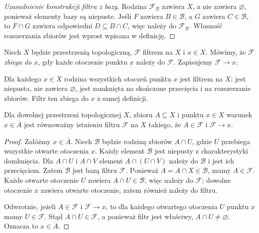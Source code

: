 \begin{proof}[Uzasadnienie konstrukcji filtru z bazy]
Rodzina $\mathcal F_{\mathcal B}$ zawiera $X$,
a nie zawiera $\varnothing$, ponieważ elementy bazy
są niepuste. Jeśli $F$ zawiera $B\in\mathcal B$, a $G$
zawiera $C\in\mathcal B$, to $F\cap G$ zawiera
odpowiedni $D\subseteq B\cap C$, więc należy
do $\mathcal F_{\mathcal B}$. Własność rozszerzania
zbiorów jest wprost wpisana w definicję.
\end{proof}

\begin{definicja}
\label{def:topog-filtr-granica}
Niech $X$ będzie przestrzenią topologiczną,
$\mathcal F$ filtrem na $X$ i $x\in X$.
Mówimy, że $\mathcal F$ \emph{zbiega do $x$}, gdy
każde otoczenie punktu $x$ należy do $\mathcal F$.
Zapisujemy $\mathcal F\to x$.
\end{definicja}

\begin{przyklad}
\label{ex:topog-filtr-otoczen}
Dla każdego $x\in X$ rodzina wszystkich otoczeń
punktu $x$ jest filtrem na $X$: jest niepusta,
nie zawiera $\varnothing$, jest zamknięta na skończone
przecięcia i na rozszerzanie zbiorów.
Filtr ten zbiega do $x$ z samej definicji.
\end{przyklad}

\begin{twierdzenie}
\label{thm:topog-filtr-domkniecie}
Dla dowolnej przestrzeni topologicznej $X$,
zbioru $A\subseteq X$ i punktu $x\in X$ warunek
$x\in\overline A$ jest równoważny istnieniu
filtru $\mathcal F$ na $X$ takiego, że
$A\in\mathcal F$ i $\mathcal F\to x$.
\end{twierdzenie}
\begin{proof}
Załóżmy $x\in\overline A$. Niech $\mathcal B$
będzie rodziną zbiorów $A\cap U$, gdzie $U$
przebiega wszystkie otwarte otoczenia $x$.
Każdy element $\mathcal B$ jest niepusty z
charakterystyki domknięcia. Dla $A\cap U$ i $A\cap V$
element $A\cap(U\cap V)$ należy do $\mathcal B$
i jest ich przecięciem. Zatem $\mathcal B$ jest bazą
filtru $\mathcal F$. Ponieważ $A=A\cap X\in\mathcal B$,
mamy $A\in\mathcal F$. Każde otwarte otoczenie
$U$ zawiera $A\cap U\in\mathcal B$, więc należy
do $\mathcal F$; dowolne otoczenie $x$ zawiera
otwarte otoczenie, zatem również należy do filtru.

Odwrotnie, jeżeli $A\in\mathcal F$ i
$\mathcal F\to x$, to dla każdego otwartego
otoczenia $U$ punktu $x$ mamy $U\in\mathcal F$.
Stąd $A\cap U\in\mathcal F$, a ponieważ filtr
jest właściwy, $A\cap U\ne\varnothing$.
Oznacza to $x\in\overline A$.
\end{proof}

